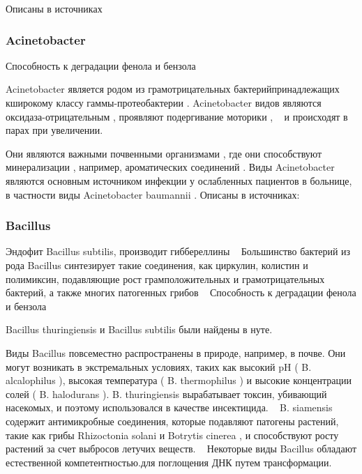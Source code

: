 \documentclass[11pt]{article}
\begin{document}
	Описаны в источниках ~\cite{Enterobacter_1 - Enterobacter_8}
	
	\subsubsection{Acinetobacter}
	Способность к деградации фенола и бензола ~\cite{09593330.2017.1337232}
	
	Acinetobacter является родом из грамотрицательных бактерийпринадлежащих кширокому классу гаммы-протеобактерии . Acinetobacter видов являются оксидаза-отрицательным , проявляют подергивание моторики , ~\cite{Acinetobacter_4} и происходят в парах при увеличении.
	
	Они являются важными почвенными организмами , где они способствуют минерализации , например, ароматических соединений . Виды Acinetobacter являются основным источником инфекции у ослабленных пациентов в больнице, в частности виды Acinetobacter baumannii . Описаны в источниках: ~\cite{Acinetobacter_1,Acinetobacter_2,Acinetobacter_3,Acinetobacter_4,Acinetobacter_5,Acinetobacter_6,Acinetobacter_7,Acinetobacter_8,Acinetobacter_9,Acinetobacter_10,Acinetobacter_11,Acinetobacter_12,Acinetobacter_13,Acinetobacter_14, Acinetobacter_15}
	
	\subsubsection{Bacillus}
	Эндофит Bacillus subtilis, производит гиббереллины ~\cite{j.1751-7915.2011.00253.x}
	Большинство бактерий из рода Bacillus синтезирует такие соединения, как циркулин, колистин и полимиксин, подавляющие рост грамположительных и грамотрицательных бактерий, а также многих патогенных грибов ~\cite{S0003683811040090}
	Способность к деградации фенола и бензола ~\cite{09593330.2017.1337232}
	  
   Bacillus thuringiensis и Bacillus subtilis были найдены в нуте.
    
    Виды Bacillus повсеместно распространены в природе, например, в почве. Они могут возникать в экстремальных условиях, таких как высокий pH ( B. alcalophilus ), высокая температура ( B. thermophilus ) и высокие концентрации солей ( B. halodurans ). B. thuringiensis вырабатывает токсин, убивающий насекомых, и поэтому использовался в качестве инсектицида. ~\cite{Bacillus_19} B. siamensis содержит антимикробные соединения, которые подавляют патогены растений, такие как грибы Rhizoctonia solani и Botrytis cinerea , и способствуют росту растений за счет выбросов летучих веществ. ~\cite{Bacillus_20} Некоторые виды Bacillus обладают естественной компетентностью.для поглощения ДНК путем трансформации. ~\cite{Bacillus_21}
    
\end{document}
